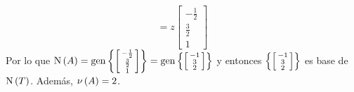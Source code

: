 \begin{solution}
\begin{enumerate}[a)]
\[	= z
	\begin{bmatrix}
		-\frac{1}{2}\\
		\frac{3}{2}\\
		1
	\end{bmatrix}
	\]
	Por lo que $\mnuc{A} =\mgen[1]{\set{\begin{bsmallmatrix}
		-\frac{1}{2}\\
		\frac{3}{2}\\
		1	
	\end{bsmallmatrix}}} =\mgen[1]{\set{\begin{bsmallmatrix}
	-1\\
	3\\
	2	
\end{bsmallmatrix}}}$ y entonces $\left\{ \begin{bsmallmatrix}
-1\\
3\\
2	
\end{bsmallmatrix} \right\}$ es base de $\mnuc{T}$. Además, $\mnu{A} = 2$.
	\end{enumerate} 
\end{solution}